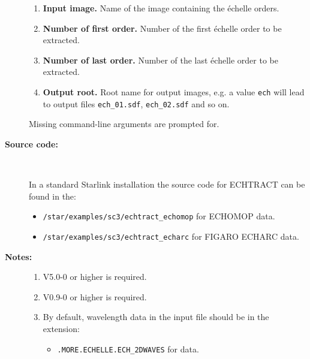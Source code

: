 \documentclass[twoside,11pt]{starlink}
\begin{document}
\begin{description}
\begin{enumerate}
\item \textbf{Input image.}
      Name of the image containing the \'{e}chelle orders.

\item \textbf{Number of first order.}
      Number of the first \'{e}chelle order to be extracted.

\item \textbf{Number of last order.}
      Number of the last \'{e}chelle order to be extracted.

\item \textbf{Output root.}
      Root name for output images, e.g. a value \verb+ech+ will
      lead to output files \verb+ech_01.sdf+, \verb+ech_02.sdf+
      and so on.

\end{enumerate}

     Missing command-line arguments are prompted for.

\item [\textbf{Source code:}] \mbox{} \\
\begin{latexonly}
In a standard Starlink installation the source code for ECHTRACT can be found
in the:
\begin{itemize}

\item \texttt{/star/examples/sc3/echtract\_echomop} for ECHOMOP data.

\item \texttt{/star/examples/sc3/echtract\_echarc} for FIGARO ECHARC data.

\end{itemize}
\end{latexonly}



\item [\textbf{Notes:}] \mbox{}
\begin{enumerate}
\item {} V5.0-0 or higher is required.

\item {} V0.9-0 or higher is required.

\item By default, wavelength data in the input file should be in the
      extension:

\begin{itemize}

\item \verb+.MORE.ECHELLE.ECH_2DWAVES+ for  data.


\end{itemize}
\end{enumerate}
\end{description}
\end{document}
